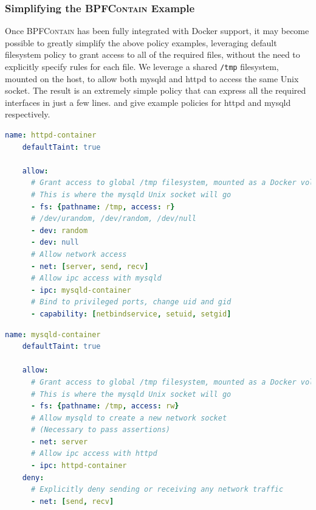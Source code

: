 \documentclass[
  fontsize=12pt,
  titlepage=firstiscover,
  paper=letter,
oneside,
  cleardoublepage=plain,
  parskip=half-,
  DIV=10,
  parindent,
  appendixprefix,
  chapterprefix,
  listof=totoc,
]{scrbook}
\newcommand{\bpfcontain}{\textsc{BPFContain}}
\begin{document}
\subsubsection{Simplifying the \bpfcontain{} Example}

Once \bpfcontain{} has been fully integrated with Docker support, it may become possible
to greatly simplify the above policy examples, leveraging default filesystem policy to
grant access to all of the required files, without the need to explicitly specify rules
for each file. We leverage a shared \texttt{/tmp} filesystem, mounted on the host, to
allow both mysqld and httpd to access the same Unix socket. The result is an extremely
simple policy that can express all the required interfaces in just a few lines.
 and  give example
policies for httpd and mysqld respectively.

\begin{lstlisting}[language=yaml, gobble=4, float=false, caption={[A simplified \bpfcontain{} policy for Apache httpd]
  A simplified \bpfcontain{} policy for Apache httpd running in a Docker container,
  leveraging future support for automatic filesystem policy.
}, label={lst:bpfcontain-httpd-next}]
    name: httpd-container
    defaultTaint: true

    allow:
      # Grant access to global /tmp filesystem, mounted as a Docker volume
      # This is where the mysqld Unix socket will go
      - fs: {pathname: /tmp, access: r}
      # /dev/urandom, /dev/random, /dev/null
      - dev: random
      - dev: null
      # Allow network access
      - net: [server, send, recv]
      # Allow ipc access with mysqld
      - ipc: mysqld-container
      # Bind to privileged ports, change uid and gid
      - capability: [netbindservice, setuid, setgid]
\end{lstlisting}

\begin{lstlisting}[language=yaml, gobble=4, float=false, caption={[A simplified \bpfcontain{} policy for MySQL]
  A simplified \bpfcontain{} policy for MySQL running in a Docker container, leveraging
  future support for automatic filesystem policy.
}, label={lst:bpfcontain-mysqld-next}]
    name: mysqld-container
    defaultTaint: true

    allow:
      # Grant access to global /tmp filesystem, mounted as a Docker volume
      # This is where the mysqld Unix socket will go
      - fs: {pathname: /tmp, access: rw}
      # Allow mysqld to create a new network socket
      # (Necessary to pass assertions)
      - net: server
      # Allow ipc access with httpd
      - ipc: httpd-container
    deny:
      # Explicitly deny sending or receiving any network traffic
      - net: [send, recv]
\end{lstlisting}
\end{document}
